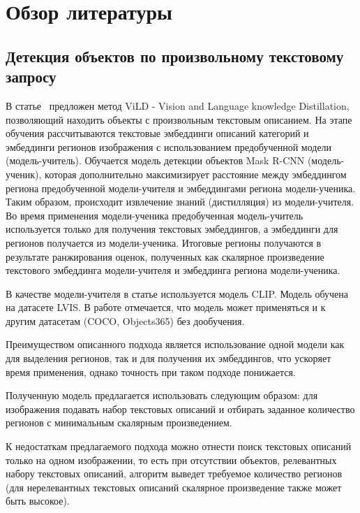 \documentclass[a4paper,14pt]{article}
\begin{document}
    \newpage


    \section{Обзор литературы}

    \subsection{Детекция объектов по произвольному текстовому запросу}

    В статье~\cite{ViLD} предложен метод ViLD - Vision and Language knowledge Distillation, позволяющий находить объекты с произвольным текстовым описанием.
    На этапе обучения рассчитываются текстовые эмбеддинги описаний категорий и эмбеддинги регионов изображения с использованием предобученной модели (модель-учитель).
    Обучается модель детекции объектов Mask R-CNN (модель-ученик), которая дополнительно максимизирует расстояние между эмбеддингом региона предобученной модели-учителя и эмбеддингами региона модели-ученика.
    Таким образом, происходит извлечение знаний (дистилляция) из модели-учителя.
    Во время применения модели-ученика предобученная модель-учитель используется только для получения текстовых эмбеддингов, а эмбеддинги для регионов получается из модели-ученика.
    Итоговые регионы получаются в результате ранжирования оценок, полученных как скалярное произведение текстового эмбеддинга модели-учителя и эмбеддинга региона модели-ученика.

    В качестве модели-учителя в статье используется модель CLIP.
    Модель обучена на датасете LVIS.
    В работе отмечается, что модель может применяться и к другим датасетам (COCO, Objects365) без дообучения.

    Преимуществом описанного подхода является использование одной модели как для выделения регионов, так и для получения их эмбеддингов, что ускоряет время применения, однако точность при таком подходе понижается.

    Полученную модель предлагается использовать следующим образом: для изображения подавать набор текстовых описаний и отбирать заданное количество регионов с минимальным скалярным произведением.

    К недостаткам предлагаемого подхода можно отнести поиск текстовых описаний только на одном изображении, то есть при отсутствии объектов, релевантных набору текстовых описаний, алгоритм выведет требуемое количество регионов (для нерелевантных текстовых описаний скалярное произведение также может быть высокое).
\end{document}
